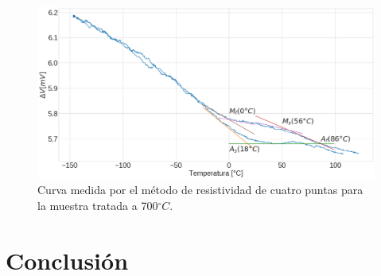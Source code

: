 \documentclass[11pt]{beamer}
\begin{document}
		\begin{frame}
			\begin{figure}[H]
				\centering
				\includegraphics[scale=0.2]{img/Resistance_700.png}
				\caption*{Curva medida por el método de resistividad de cuatro puntas para la muestra tratada a 700$^\circ C$.}

			\end{figure}
		\end{frame}
	

\section{Conclusión}
\end{document}
